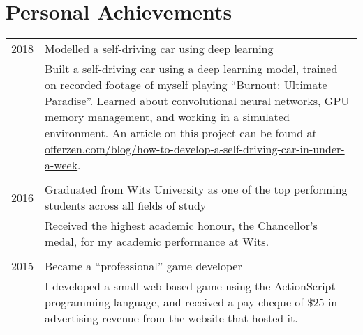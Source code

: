 \section{Personal Achievements}

\begin{tabular}{rp{12cm}}
	2018 & Modelled a self-driving car using deep learning \\
	& \small{Built a self-driving car using a deep learning model, trained on recorded footage of myself playing “Burnout: Ultimate Paradise”.  Learned about convolutional neural networks, GPU memory management, and working in a simulated environment. An article on this project can be found at \href{https://www.offerzen.com/blog/how-to-develop-a-self-driving-car-in-under-a-week}{offerzen.com/blog/how-to-develop-a-self-driving-car-in-under-a-week}}. \\
	& \\
	2016 & Graduated from Wits University as one of the top performing students across all fields of study \\
	& \small{Received the highest academic honour, the Chancellor’s medal, for my academic performance at Wits.} \\
	& \\
	2015 & Became a ``professional'' game developer \\
	& \small{I developed a small web-based game using the ActionScript programming language, and received a pay cheque of \$25 in advertising revenue from the website that hosted it.}
\end{tabular}